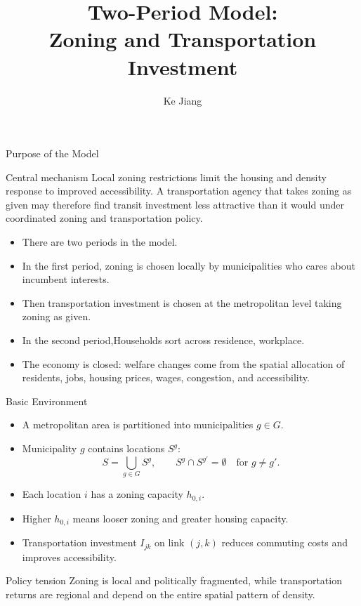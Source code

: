 \documentclass[10pt]{beamer}
\title[Two-Period Model]{Two-Period Model:\\Zoning and Transportation Investment}
\author{Ke Jiang}
\institute{Southern Methodist University}
\date{}
\begin{document}
\begin{frame}
  \titlepage
\end{frame}

\begin{frame}{Purpose of the Model}
\begin{block}{Central mechanism}
Local zoning restrictions limit the housing and density response to improved accessibility. A transportation agency that takes zoning as given may therefore find transit investment less attractive than it would under coordinated zoning and transportation policy.
\end{block}

\vspace{0.3cm}
\begin{itemize}
    \item There are two periods in the model.
    \item In the first period, zoning is chosen locally by municipalities who cares about incumbent interests.
    \item Then transportation investment is chosen at the metropolitan level taking zoning as given.
    \item In the second period,Households sort across residence, workplace.
    \item The economy is closed: welfare changes come from the spatial allocation of residents, jobs, housing prices, wages, congestion, and accessibility.
\end{itemize}
\end{frame}

\begin{frame}{Basic Environment}
\begin{itemize}
    \item A metropolitan area is partitioned into municipalities $g \in G$.
    \item Municipality $g$ contains locations $S^g$:
    \[
        S = \bigcup_{g \in G} S^g,
        \qquad
        S^g \cap S^{g'} = \emptyset \quad \text{for } g \neq g'.
    \]
    \item Each location $i$ has a zoning capacity $h_{0,i}$.
    \item Higher $h_{0,i}$ means looser zoning and greater housing capacity.
    \item Transportation investment $I_{jk}$ on link $(j,k)$ reduces commuting costs and improves accessibility.
\end{itemize}

\vspace{0.25cm}
\begin{block}{Policy tension}
Zoning is local and politically fragmented, while transportation returns are regional and depend on the entire spatial pattern of density.
\end{block}
\end{frame}
\end{document}
